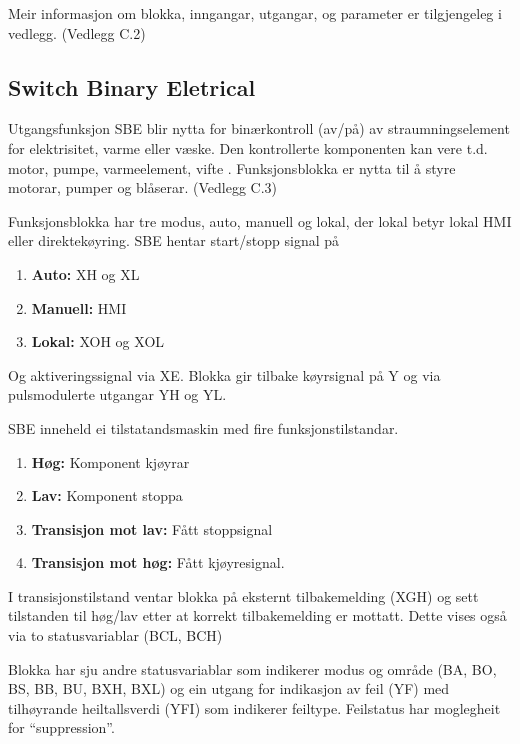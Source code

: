 Meir informasjon om blokka, inngangar, utgangar, og parameter er tilgjengeleg i vedlegg. (Vedlegg C.2)

\newpage

\subsection{Switch Binary Eletrical} 

Utgangsfunksjon \gls{SBE} blir nytta for binærkontroll (av/på) av straumningselement for elektrisitet, varme eller væske. 
Den kontrollerte komponenten kan vere t.d. motor, pumpe, varmeelement, vifte \citep{IEC-63131}. \newline
Funksjonsblokka er nytta til å styre motorar, pumper og blåserar. (Vedlegg C.3)

Funksjonsblokka har tre modus, auto, manuell og lokal, der lokal betyr lokal HMI eller direktekøyring.
\gls{SBE} hentar start/stopp signal på
\begin{enumerate}
    \item \textbf{Auto:}        XH og XL  
    \item \textbf{Manuell:}     HMI
    \item \textbf{Lokal:}       XOH og XOL
\end{enumerate}
Og aktiveringssignal via XE. \newline
Blokka gir tilbake køyrsignal på Y og via pulsmodulerte utgangar YH og YL.

\gls{SBE} inneheld ei tilstatandsmaskin med fire funksjonstilstandar. 
\begin{enumerate}
    \item \textbf{Høg:}                 Komponent kjøyrar
    \item \textbf{Lav:}                 Komponent stoppa
    \item \textbf{Transisjon mot lav:}  Fått stoppsignal
    \item \textbf{Transisjon mot høg:}  Fått kjøyresignal.
\end{enumerate}

I transisjonstilstand ventar blokka på eksternt tilbakemelding (XGH) 
og sett tilstanden til høg/lav etter at korrekt tilbakemelding er mottatt.
Dette vises også via to statusvariablar (BCL, BCH)

Blokka har sju andre statusvariablar som indikerer modus og område (BA, BO, BS, BB, BU, BXH, BXL) og
ein utgang for indikasjon av feil (YF) med tilhøyrande heiltallsverdi (YFI) som indikerer feiltype. \newline
Feilstatus har moglegheit for ``suppression''.

